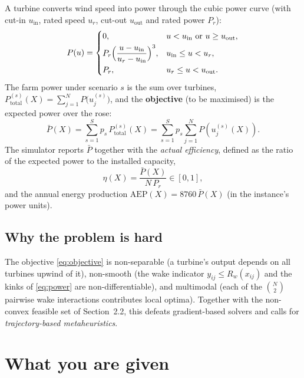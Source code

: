 \documentclass[11pt,a4paper]{article}
\begin{document}
A turbine converts wind speed into power through the cubic power curve (with
cut-in $u_{\text{in}}$, rated speed $u_{r}$, cut-out $u_{\text{out}}$ and rated
power $P_{r}$):
\begin{equation}
  P(u) =
  \begin{cases}
    0, & u < u_{\text{in}} \ \text{or} \ u \ge u_{\text{out}},\\[1mm]
    P_{r}\Bigl(\dfrac{u-u_{\text{in}}}{u_{r}-u_{\text{in}}}\Bigr)^{3},
      & u_{\text{in}} \le u < u_{r},\\[2mm]
    P_{r}, & u_{r} \le u < u_{\text{out}}.
  \end{cases}
  \label{eq:power}
\end{equation}
The farm power under scenario $s$ is the sum over turbines,
$P_{\text{total}}^{(s)}(X) = \sum_{j=1}^{N} P\bigl(u_{j}^{(s)}\bigr)$, and the
\textbf{objective} (to be maximised) is the expected power over the rose:
\begin{equation}
  \boxed{\;
  \bar{P}(X)
  = \sum_{s=1}^{S} p_{s}\, P_{\text{total}}^{(s)}(X)
  = \sum_{s=1}^{S} p_{s} \sum_{j=1}^{N}
      P\!\left( u_{j}^{(s)}(X) \right). \;}
  \label{eq:objective}
\end{equation}
The simulator reports $\bar{P}$ together with the \emph{actual efficiency},
defined as the ratio of the expected power to the installed capacity,
\begin{equation}
  \eta(X) = \frac{\bar{P}(X)}{N\,P_{r}} \in [0,1],
\end{equation}
and the annual energy production $\text{AEP}(X) = 8760\,\bar{P}(X)$ (in the
instance's power units).

\subsection{Why the problem is hard}

The objective \eqref{eq:objective} is non-separable (a turbine's output depends
on all turbines upwind of it), non-smooth (the wake indicator
$y_{ij}\le R_{w}(x_{ij})$ and the kinks of \eqref{eq:power} are
non-differentiable), and multimodal (each of the $\binom{N}{2}$ pairwise wake
interactions contributes local optima). Together with the non-convex feasible
set of Section~2.2, this defeats gradient-based solvers and calls for
\emph{trajectory-based metaheuristics}.

\section{What you are given}
\label{sec:given}
\end{document}

